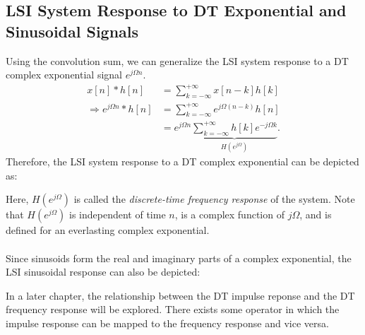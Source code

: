 \documentclass{report}
\begin{document}
\subsection{LSI System Response to DT Exponential and Sinusoidal Signals}
Using the convolution sum, we can generalize the LSI system response to a DT complex exponential signal $e^{j\Omega n}$.
\begin{align*}
    x[n] * h[n] &= \sum_{k=-\infty}^{+\infty} x[n-k]h[k] \\
    \Longrightarrow e^{j\Omega n} * h[n] &= \sum_{k=-\infty}^{+\infty} e^{j\Omega (n-k)}h[n] \\
    &= e^{j\Omega n} \underbrace{\sum_{k=-\infty}^{+\infty} h[k]e^{-j\Omega k} }_\textrm{$H(e^{j\Omega})$}.
\end{align*}
Therefore, the LSI system response to a DT complex exponential can be depicted as: 
\begin{center}
\end{center}
Here, $H(e^{j\Omega})$ is called the \emph{discrete-time frequency response} of the system. Note that $H(e^{j\Omega})$ is independent of time $n$, 
is a complex function of $j\Omega$, and is defined for an everlasting complex exponential. 
\\ \\
Since sinusoids form the real and imaginary parts of a complex exponential, the LSI sinusoidal response can also be depicted: 
\begin{center}
\end{center}
In a later chapter, the relationship between the DT impulse reponse and the DT frequency response will be explored. There exists some operator in which the impulse response can be 
mapped to the frequency response and vice versa.
\end{document}
